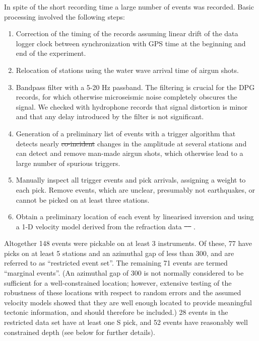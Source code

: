\documentclass[jgrga]{agu2001} %
\newlength{\tw}
\providecommand{\DIFadd}[1]{{\protect\color{blue}\uwave{#1}}} %
\providecommand{\DIFdel}[1]{{\protect\color{red}\sout{#1}}}                      %
\providecommand{\DIFaddbegin}{} %
\providecommand{\DIFaddend}{} %
\providecommand{\DIFdelbegin}{} %
\providecommand{\DIFdelend}{} %
\begin{document}
\begin{article}
 In spite of the short recording time a large number of events was
recorded. Basic processing involved the following steps:
\begin{enumerate}
\item 
Correction of the timing of the records assuming  linear drift
of the data logger clock between synchronization with GPS time at the
beginning and end of the experiment.  
\item Relocation of stations using the water wave arrival time of
airgun shots.
\item Bandpass filter with a 5-20 Hz passband.  The
filtering is crucial for the DPG records, for which otherwise
microseismic noise completely obscures the signal. We checked with
hydrophone records that signal distortion is minor and that any delay introduced by
the filter is not significant.  
\item Generation of  a preliminary list of events
with a trigger algorithm that  detects nearly
\DIFdelbegin \DIFdel{co-incident }\DIFdelend \DIFaddbegin \DIFadd{coincident }\DIFaddend changes in the amplitude at several stations and can
detect and remove man-made airgun shots, which otherwise lead to a
large number of spurious triggers.  
\item Manually inspect all trigger events and pick arrivals, assigning
a weight to each pick. Remove
events, which are unclear, presumably not earthquakes, or cannot be
picked on at least three stations. 
\item Obtain a preliminary location of each event by linearised
inversion and using a 1-D velocity model derived from the refraction
data \DIFdelbegin \DIFdel{\mbox{%
\citep{planert-con03}
}%
}\DIFdelend \DIFaddbegin \DIFadd{\mbox{%
\citetext{see \citealp{planert-con03}, and section~\ref{sec:refraction} below}
}%
}\DIFaddend .
\end{enumerate}
Altogether 148 events were pickable on at least 3 instruments. Of
these, 77 have picks on at least 5 stations and an azimuthal gap of
less than 300\dg, and are referred to as ``restricted event set''. The
remaining 71 events are termed ``marginal events''. (An azimuthal gap
of 300{\dg} is not normally considered to be sufficient for a
well-constrained location; however, extensive testing of the
robustness of these locations with respect to random errors and the
assumed velocity models showed that they are well enough located to
provide meaningful tectonic information, and should therefore be included.)
28 events in the
restricted data set
 have at least one S pick, and 52 events have reasonably well
constrained depth (see below for further details). 


\end{article}
\end{document}
